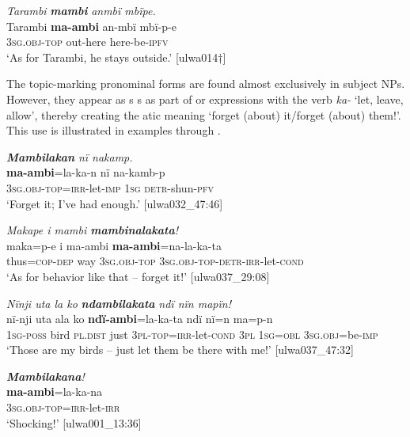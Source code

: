 \ea%
    \label{ex:pron:90}
          \textit{Tarambi} \textbf{\textit{mambi}} \textit{anmbï mbïpe.}\\
\gll Tarambi  \textbf{ma-ambi}    an-mbï    mbï-p-e\\
    [name]    3\textsc{sg.obj-top}  out-here  here-be\textsc{{}-ipfv}\\
\glt `As for Tarambi, he stays outside.’ [ulwa014†]
\z

The topic-marking pronominal forms are found almost exclusively in subject NPs. However, they appear as s s as part of  or  expressions with the verb \textit{ka-} ‘let, leave, allow’, thereby creating the atic meaning ‘forget (about) it/forget (about) them!’. This use is illustrated in examples  through .


\ea%
    \label{ex:pron:91}
          \textbf{\textit{Mambilakan}} \textit{nï nakamp.}\\
\gll  \textbf{ma-ambi}=la-ka-n      nï    na-kamb-p\\
    3\textsc{sg.obj-top=irr-}let-\textsc{imp}  1\textsc{sg}  \textsc{detr-}shun-\textsc{pfv}\\
\glt `Forget it; I’ve had enough.’ [ulwa032\_47:46]
\z

\ea%
    \label{ex:pron:92}
          \textit{Makape i mambi \textbf{mambinalakata}!}\\
\gll    maka=p-e    i    ma-ambi \textbf{ma-ambi}=na-la-ka-ta\\
    thus=\textsc{cop-dep}  way  3\textsc{sg.obj-top}    3\textsc{sg.obj-top-detr-irr-}let-\textsc{cond}\\
\glt `As for behavior like that -- forget it!’ [ulwa037\_29:08]
\z

\ea%
    \label{ex:pron:93}
          \textit{Nïnji uta la ko} \textbf{\textit{ndambilakata}} \textit{ndï nïn mapïn!}\\
\gll nï-nji    uta    ala      ko  \textbf{ndï-ambi}=la-ka-ta    ndï nï=n     ma=p-n\\
    1\textsc{sg-poss}  bird  \textsc{pl.dist}  just  \textsc{3pl-top=irr-}let\textsc{{}-cond}  \textsc{3pl}    1\textsc{sg=obl}  3\textsc{sg.obj}=be-\textsc{imp}\\
\glt `Those are my birds -- just let them be there with me!’ [ulwa037\_47:32]
\z

\ea%
    \label{ex:pron:94}
          \textit{\textbf{Mambilakana}!}\\
\gll    \textbf{ma-ambi}=la-ka-na\\
    3\textsc{sg.obj-top}=\textsc{irr-}let-\textsc{irr}\\
\glt `Shocking!’ [ulwa001\_13:36]
\z

